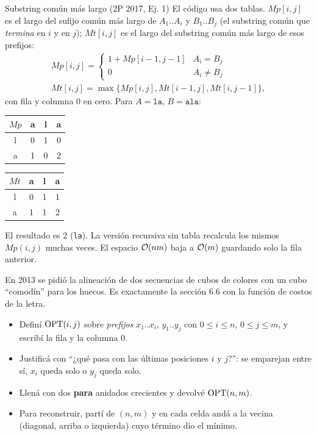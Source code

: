 \begin{problema}{Substring común más largo (2P 2017, Ej. 1)}
El código usa dos tablas. $\mathit{Mp}[i,j]$ es el largo del sufijo común más largo
de $A_1..A_i$ y $B_1..B_j$ (el substring común que \emph{termina} en $i$ y
en $j$); $\mathit{Mt}[i,j]$ es el largo del substring común más largo de esos
prefijos:
\begin{gather*}
\mathit{Mp}[i,j]=\begin{cases}1+\mathit{Mp}[i-1,j-1] & A_i=B_j\\ 0 & A_i\ne B_j\end{cases}\\
\mathit{Mt}[i,j]=\max\{\mathit{Mp}[i,j],\mathit{Mt}[i-1,j],\mathit{Mt}[i,j-1]\},
\end{gather*}
con fila y columna 0 en cero. Para $A=\texttt{la}$, $B=\texttt{ala}$:

\begin{center}
\begin{tabular}{c|ccc}
$\mathit{Mp}$ & a & l & a\\\hline
l & 0 & 1 & 0\\
a & 1 & 0 & 2
\end{tabular}\qquad
\begin{tabular}{c|ccc}
$\mathit{Mt}$ & a & l & a\\\hline
l & 0 & 1 & 1\\
a & 1 & 1 & 2
\end{tabular}
\end{center}

El resultado es 2 (\texttt{la}). La versión recursiva sin tabla recalcula
los mismos $\mathit{Mp}(i,j)$ muchas veces. El espacio $\mathcal{O}(nm)$ baja a $\mathcal{O}(m)$
guardando solo la fila anterior.
\end{problema}

En 2013 se pidió la alineación de dos secuencias de cubos de colores con un
cubo ``comodín'' para los huecos. Es exactamente la sección 6.6 con la
función de costos de la letra.

\begin{receta}
\begin{itemize}[leftmargin=1.2em]
  \item Definí $\mathrm{OPT}(i,j)$ sobre \emph{prefijos} $x_1..x_i$, $y_1..y_j$ con
  $0\le i\le n$, $0\le j\le m$, y escribí la fila y la columna 0.
  \item Justificá con ``¿qué pasa con las últimas posiciones $i$ y $j$?'': se
  emparejan entre sí, $x_i$ queda solo o $y_j$ queda solo.
  \item Llená con dos \textbf{para} anidados crecientes y devolvé $\mathrm{OPT}(n,m)$.
  \item Para reconstruir, partí de $(n,m)$ y en cada celda andá a la vecina
  (diagonal, arriba o izquierda) cuyo término dio el mínimo.
\end{itemize}
\end{receta}

